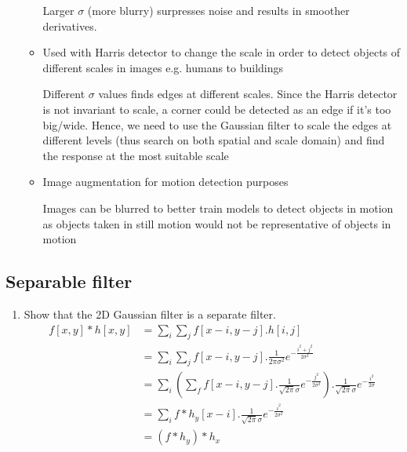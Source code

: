 \documentclass[9pt]{article}
\begin{document}
\begin{multicols*}{2}
\begin{enumerate}
\begin{itemize}
                Larger $\sigma$ (more blurry) surpresses noise and results in smoother derivatives. 


                \item Used with Harris detector to change the scale in order to detect objects of different scales in images e.g. humans to buildings 
                
                Different $\sigma$ values finds edges at different scales. Since the Harris detector is not invariant to scale, a corner could be detected as an edge if it's too
                big/wide. Hence, we need to use the Gaussian filter to scale the edges at different levels (thus
                search on both spatial and scale domain) and find the response at the most suitable scale

                \item Image augmentation for motion detection purposes 
                
                Images can be blurred to better train models to detect objects in motion as objects taken in still motion would not be representative of objects in motion
            \end{itemize}
        \end{enumerate}

        \subsection{Separable filter}
        \begin{enumerate}
            \item Show that the 2D Gaussian filter is a separate filter.
            \begin{align*}
                f[x,y] * h[x,y] &= \sum_i \sum_j f[x-i, y-j].h[i,j] \\ 
                &= \sum_i \sum_j f[x-i, y-j] . \frac{1}{2\pi \sigma^2} e^{- \frac{i^2 + j^2}{2\sigma^2}} \\
                &= \sum_i \left(\sum_f f[x-i, y-j].\frac{1}{\sqrt{2\pi} \sigma} e^{-\frac{j^2}{2\sigma^2}}\right) . \frac{1}{\sqrt{2\pi}\sigma} e^{- \frac{i^2}{2\sigma}} \\ 
                &= \sum_i f \ast h_y[x-i].\frac{1}{\sqrt{2\pi}\sigma} e^{- \frac{i^2}{2\sigma^2}} \\ 
                &= (f \ast h_y) \ast h_x
            \end{align*}
        \end{enumerate}


\end{multicols*}
\end{document}
